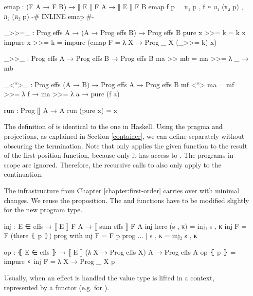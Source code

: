 \begin{code}
emap : (F A → F B) → ⟦ E ⟧ F A → ⟦ E ⟧ F B
emap f p = π₁ p , f ∘ π₁ (π₂ p) , π₂ (π₂ p)
{-# INLINE emap #-}

_>>=_ : Prog effs A → (A → Prog effs B) → Prog effs B
pure x    >>= k = k x
impure x  >>= k = impure (emap {F = λ X → Prog _ X} (_>>= k) x)
\end{code}
\begin{code}[hide]
_>>_ : Prog effs A → Prog effs B → Prog effs B
ma >> mb = ma >>= λ _ → mb

_<*>_ : Prog effs (A → B) → Prog effs A → Prog effs B
mf <*> ma = mf >>= λ f → ma >>= λ a → pure (f a)

run : Prog [] A → A
run (pure x) = x
\end{code}
The definition of \AgdaFunction{>>=} is identical to the one in Haskell.
Using the  pragma and projections, as explained in Section
\ref{container}, we can define  separately without obscuring
the termination.
Note that  only applies the given function to the result of
the first position function, because only it has access to .
The programs in scope are ignored.
Therefore, the recursive calls to \AgdaFunction{>>=} also only apply to the
continuation.

The infrastructure from Chapter \ref{chapter:first-order} carries over with
minimal changes.
We reuse the  proposition.
The  and  functions have to be modified
slightly for the new program type.

\begin{code}
inj : E ∈ effs → ⟦ E ⟧ F A → ⟦ sum effs ⟧ F A
inj here           (s , κ) = inj₁ s , κ
inj {F = F} (there ⦃ p ⦄)  prog with inj {F = F} p prog
... | s , κ = inj₂ s , κ

op : ⦃ E ∈ effs ⦄ → ⟦ E ⟧ (λ X → Prog effs X) A → Prog effs A
op ⦃ p ⦄ = impure ∘ inj {F = λ X → Prog _ X} p
\end{code}
Usually, when an effect is handled the value type is lifted in a context,
represented by a functor (e.g.  for ).

